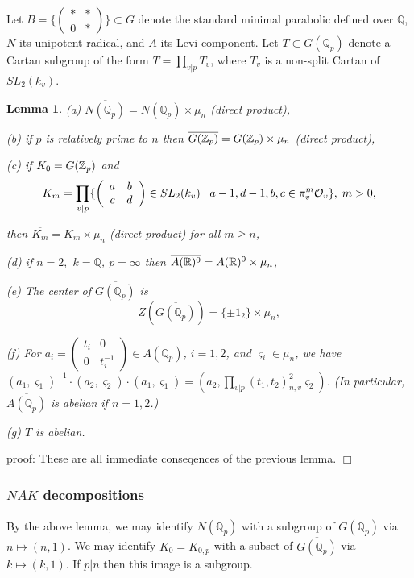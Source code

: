 \documentclass[amsfonts,12pt]{article}
\newtheorem{lemma}[theorem]{Lemma}
\def\qqq{\mathbb{Q}}
\begin{document}
Let $B=\{\left( 
\begin{array}{cc}
\ast & * \\ 
0 & *
\end{array}
\right) \}\subset G$ denote the standard minimal parabolic
defined over $\qqq$, $N$ its unipotent radical, and
$A$ its Levi component. Let
$T\subset G(\qqq_p)$ denote a Cartan subgroup of the form
$T=\prod_{v|p}T_v$, where $T_v$ is a non-split
Cartan of $SL_2(k_v)$.

\begin{lemma}
(a) $\overline{N(\qqq_p)}=N(\qqq_p)\times \mu _n$ (direct product),

(b) if $p$ is relatively prime to $n$
then $\overline{G({\Bbb{Z}}_p)}=G({\Bbb{Z}}_p)\times \mu _n$ (direct product),

(c) if $K_0=G({\Bbb{Z}}_p)$ and 
\[
K_m=\prod_{v|p}\{\left( 
\begin{array}{cc}
a & b \\ 
c & d
\end{array}
\right) \in SL_2(k_v)\;|\;a-1,d-1,b,c\in \pi _v^m{\cal{O}}_v\},\;m>0,
\]

then $\overline{K_m}=K_m\times \mu _n$ (direct product) for all $m\geq n$,

(d) if $n=2,$ $k=\qqq$, $p=\infty $ then 
$\overline{A({\Bbb R})^0}=A({\Bbb R})^0 \times \mu _n$,

(e) The center of $\overline{G(\qqq_p)}$ is 
\[
Z(\overline{G(\qqq_p)})=
\{\pm 1_2\}\times \mu _n,
\]

(f) For $a_i=\left( 
\begin{array}{cc}
t_i & 0 \\ 
0 & t_i^{-1}
\end{array}
\right) \in A(\qqq_p)$, $i=1,2$, and $\varsigma _i\in \mu _n$, we have $%
(a_1,\varsigma _1)^{-1}\cdot (a_2,\varsigma _2)\cdot (a_1,\varsigma
_1)=(a_2,\prod_{v|p}(t_1,t_2)_{n,v}^2\varsigma _2)$.
(In particular, $\overline{A(\qqq_p)}$ is abelian if $n=1,2$.)

(g) $\overline{T}$ is abelian.
\end{lemma}

proof: These are all immediate conseqences of the previous lemma. $\Box $

\subsubsection{$NAK$ decompositions}

By the above lemma, we may identify $N(\qqq_p)$ with a subgroup of $%
\overline{G(\qqq_p)}$ via $n\longmapsto (n,1)$. We may identify $%
K_0=K_{0,p}$ with a subset of $\overline{G(\qqq_p)}$ via $k\longmapsto
(k,1)$. If $p|n$ then this image is a subgroup.
\end{document}
